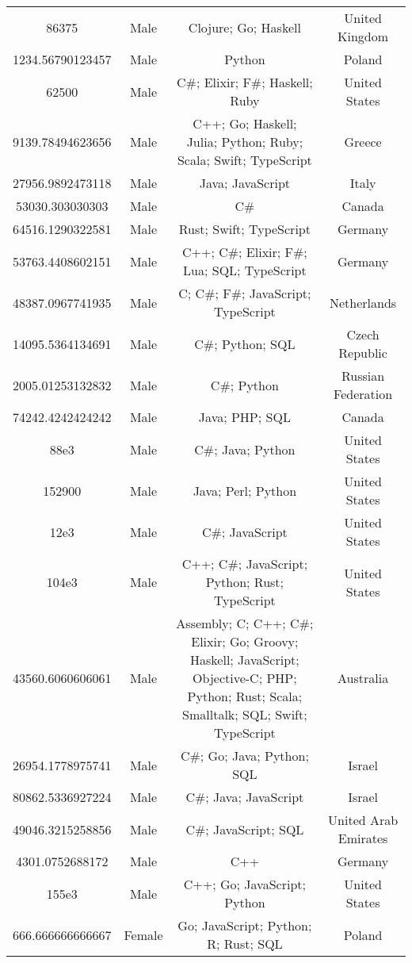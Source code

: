 \begin{center}
\begin{tabular}{ |c|c|c|c| }
86375  &  Male  &  Clojure; Go; Haskell  &  United Kingdom  \\ 
1234.56790123457  &  Male  &  Python  &  Poland  \\ 
62500  &  Male  &  C\#; Elixir; F\#; Haskell; Ruby  &  United States  \\ 
9139.78494623656  &  Male  &  C++; Go; Haskell; Julia; Python; Ruby; Scala; Swift; TypeScript  &  Greece  \\ 
27956.9892473118  &  Male  &  Java; JavaScript  &  Italy  \\ 
53030.303030303  &  Male  &  C\#  &  Canada  \\ 
64516.1290322581  &  Male  &  Rust; Swift; TypeScript  &  Germany  \\ 
53763.4408602151  &  Male  &  C++; C\#; Elixir; F\#; Lua; SQL; TypeScript  &  Germany  \\ 
48387.0967741935  &  Male  &  C; C\#; F\#; JavaScript; TypeScript  &  Netherlands  \\ 
14095.5364134691  &  Male  &  C\#; Python; SQL  &  Czech Republic  \\ 
2005.01253132832  &  Male  &  C\#; Python  &  Russian Federation  \\ 
74242.4242424242  &  Male  &  Java; PHP; SQL  &  Canada  \\ 
88e3  &  Male  &  C\#; Java; Python  &  United States  \\ 
152900  &  Male  &  Java; Perl; Python  &  United States  \\ 
12e3  &  Male  &  C\#; JavaScript  &  United States  \\ 
104e3  &  Male  &  C++; C\#; JavaScript; Python; Rust; TypeScript  &  United States  \\ 
43560.6060606061  &  Male  &  Assembly; C; C++; C\#; Elixir; Go; Groovy; Haskell; JavaScript; Objective-C; PHP; Python; Rust; Scala; Smalltalk; SQL; Swift; TypeScript  &  Australia  \\ 
26954.1778975741  &  Male  &  C\#; Go; Java; Python; SQL  &  Israel  \\ 
80862.5336927224  &  Male  &  C\#; Java; JavaScript  &  Israel  \\ 
49046.3215258856  &  Male  &  C\#; JavaScript; SQL  &  United Arab Emirates  \\ 
4301.0752688172  &  Male  &  C++  &  Germany  \\ 
155e3  &  Male  &  C++; Go; JavaScript; Python  &  United States  \\ 
666.666666666667  &  Female  &  Go; JavaScript; Python; R; Rust; SQL  &  Poland  \\ 

\end{tabular}
\end{center}
